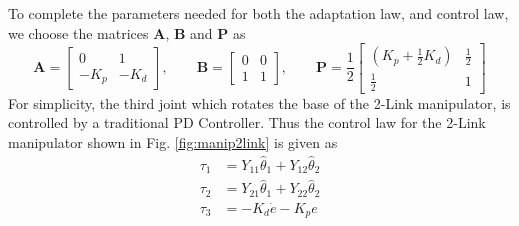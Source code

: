 To complete the parameters needed for both the adaptation law, and control law, we choose the matrices $\mathbf{A}$, $\mathbf{B}$ and $\mathbf{P}$ as
\begin{equation}
	\mathbf{A} =
	\begin{bmatrix}
	0 & 1\\
	-K_{p} & -K_{d}
	\end{bmatrix},\qquad
	\mathbf{B} = 
	\begin{bmatrix}
	0 & 0\\
	1 & 1
	\end{bmatrix},\qquad
	\mathbf{P} = \frac{1}{2}
	\begin{bmatrix}
		(K_{p}+\frac{1}{2}K_{d}) & \frac{1}{2}\\
		\frac{1}{2} & 1
	\end{bmatrix}
\end{equation}
For simplicity, the third joint which rotates the base of the 2-Link manipulator, is controlled by a traditional PD Controller. Thus the control law for the 2-Link manipulator shown in Fig. \ref{fig:manip2link} is given as
\begin{align}
	\tau_{1} &= Y_{11}\hat{\theta}_{1} + Y_{12}\hat{\theta}_{2}\\[0.25cm]
	\tau_{2} &= Y_{21}\hat{\theta}_{1} + Y_{22}\hat{\theta}_{2}\\[0.25cm]
	\tau_{3} &= -K_{d}\dot{e} - K_{p}e
\end{align}

